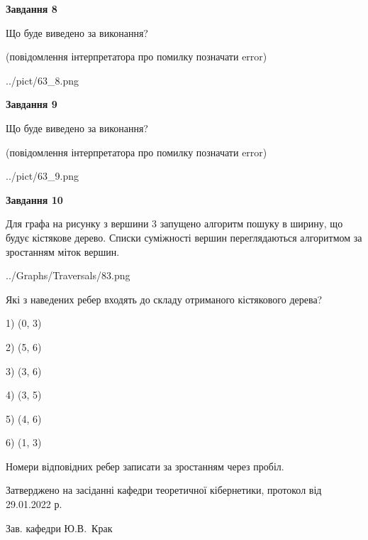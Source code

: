 \documentclass[12pt, ukrainian]{article}
\begin{document}
{\begin {large}
{\begin {center}\textbf{Завдання 8}\end {center}}\par
Що буде виведено за виконання?\par
 (повідомлення інтерпретатора про помилку позначати error)
\begin{center}
	{../pict/63_8.png}
\end{center}
\newpage

{\begin {center}\textbf{Завдання 9}\end {center}}\par
Що буде виведено за виконання?\par
 (повідомлення інтерпретатора про помилку позначати error)\par
\begin{center}
	{../pict/63_9.png}
\end{center}
\newpage

{\begin {center}\textbf{Завдання 10}\end {center}}\par
Для графа на рисунку з вершини 3 запущено алгоритм пошуку в ширину, що будує кістякове дерево. Списки суміжності вершин переглядаються алгоритмом за зростанням міток вершин.\par
\begin{center}
	{../Graphs/Traversals/83.png}
\end{center}
\par Які з наведених ребер входять до складу отриманого кістякового дерева?\par
1) (0, 3)\par
2) (5, 6)\par
3) (3, 6)\par
4) (3, 5)\par
5) (4, 6)\par
6) (1, 3)\par
{\vskip 15pt} Номери відповідних ребер записати за зростанням через пробіл.\par
\newpage


\end {large}
}
{\smallskip \begin {small} Затверджено на засіданні кафедри теоретичної кібернетики, протокол  від   29.01.2022 р.\par\smallskip\smallskip
{\parbox {6.5 cm}{Зав. кафедри \dotfill Ю.В.~Крак}} \end{small}}
\end{document}
